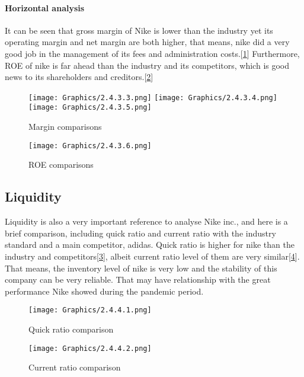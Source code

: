 \documentclass[a4paper, 12pt]{report}
\begin{document}
\paragraph{Horizontal analysis}It can be seen that gross margin of Nike is lower than the industry yet its operating margin and net margin are both higher, that means, nike did a very good job in the management of its fees and administration costs.[\ref{2.4.3 margins}] Furthermore, ROE of nike is far ahead than the industry and its competitors, which is good news to its shareholders and creditors.[\ref{2.4.3.6}]
\begin{figure}[!htbp]
     \centering
     \texttt{[image: Graphics/2.4.3.3.png]}
     \qquad
     \texttt{[image: Graphics/2.4.3.4.png]}     
     \qquad
     \texttt{[image: Graphics/2.4.3.5.png]}
     \caption{\label{2.4.3 margins}Margin comparisons}
 \end{figure}
 \begin{figure}[ht]
 			\begin{center}
				\texttt{[image: Graphics/2.4.3.6.png]} 
			\end{center}
       		\caption{\label{2.4.3.6}ROE comparisons}
 \end{figure}\par
\subsection{Liquidity}
Liquidity is also a very important reference to analyse Nike inc., and here is a brief comparison, including quick ratio and current ratio with the industry standard and a main competitor, adidas. Quick ratio is higher for nike than the industry and competitors[\ref{2.4.4.1}], albeit current ratio level of them are very similar[\ref{2.4.4.2}]. That means, the inventory level of nike is very low and the stability of this company can be very reliable. That may have relationship with the great performance Nike showed during the pandemic period.\par
 \begin{figure}[ht]
 			\begin{center}
				\texttt{[image: Graphics/2.4.4.1.png]} 
			\end{center}
       		\caption{\label{2.4.4.1}Quick ratio comparison}
 \end{figure}
 \begin{figure}[ht]
 			\begin{center}
				\texttt{[image: Graphics/2.4.4.2.png]} 
			\end{center}
       		\caption{\label{2.4.4.2}Current ratio comparison}
 \end{figure}
\end{document}

